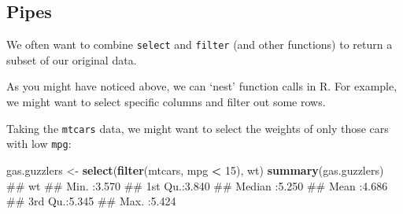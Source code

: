 \documentclass[]{article}
\newenvironment{Shaded}{\begin{snugshade}}{\end{snugshade}}
\newcommand{\KeywordTok}[1]{\textcolor[rgb]{0.13,0.29,0.53}{\textbf{#1}}}
\newcommand{\DecValTok}[1]{\textcolor[rgb]{0.00,0.00,0.81}{#1}}
\newcommand{\StringTok}[1]{\textcolor[rgb]{0.31,0.60,0.02}{#1}}
\newcommand{\OperatorTok}[1]{\textcolor[rgb]{0.81,0.36,0.00}{\textbf{#1}}}
\newcommand{\NormalTok}[1]{#1}
\theoremstyle{definition}
\theoremstyle{definition}
\theoremstyle{definition}
\theoremstyle{remark}
\begin{document}
\begin{Shaded}
\end{Shaded}

\hypertarget{pipes}{\subsection*{Pipes}\label{pipes}}

We often want to combine \texttt{select} and \texttt{filter} (and other
functions) to return a subset of our original data.

As you might have noticed above, we can `nest' function calls in R. For
example, we might want to select specific columns and filter out some
rows.

Taking the \texttt{mtcars} data, we might want to select the weights of
only those cars with low \texttt{mpg}:

\begin{Shaded}
\begin{Highlighting}[]
\NormalTok{gas.guzzlers <-}\StringTok{ }\KeywordTok{select}\NormalTok{(}\KeywordTok{filter}\NormalTok{(mtcars, mpg }\OperatorTok{<}\StringTok{ }\DecValTok{15}\NormalTok{), wt)}
\KeywordTok{summary}\NormalTok{(gas.guzzlers)}
\NormalTok{##        wt       }
\NormalTok{##  Min.   :3.570  }
\NormalTok{##  1st Qu.:3.840  }
\NormalTok{##  Median :5.250  }
\NormalTok{##  Mean   :4.686  }
\NormalTok{##  3rd Qu.:5.345  }
\NormalTok{##  Max.   :5.424}
\end{Highlighting}
\end{Shaded}
\end{document}
